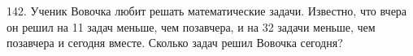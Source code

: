 142. Ученик Вовочка любит решать математические задачи. Известно, что вчера он решил на 11 задач меньше, чем позавчера, и на 32 задачи меньше, чем позавчера и сегодня вместе. Сколько задач решил Вовочка сегодня?\\
